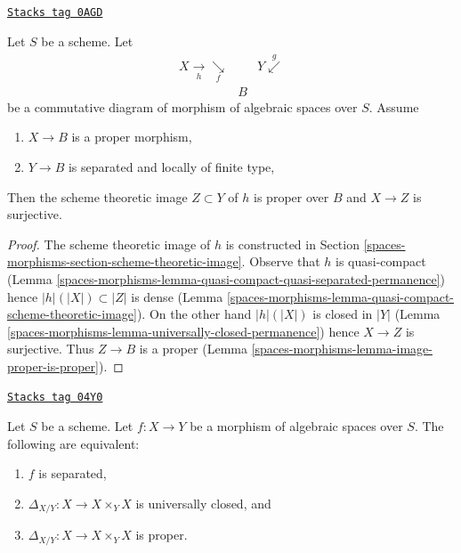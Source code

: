\begin{lemma}
\label{spaces-morphisms-lemma-scheme-theoretic-image-is-proper}
\href{https://stacks.math.columbia.edu/tag/0AGD}{\texttt{Stacks tag 0AGD}}

Let $S$ be a scheme. Let
$$
\begin{array}{ccc}X \underset{h}{\longrightarrow}\underset{f}{\searrow} &  & Y \overset{g}{\swarrow} \\  & B & \end{array}
$$
be a commutative diagram of morphism of algebraic spaces over $S$.
Assume
\begin{enumerate}
\item $X \to B$ is a proper morphism,
\item $Y \to B$ is separated and locally of finite type,
\end{enumerate}
Then the scheme theoretic image $Z \subset Y$ of $h$
is proper over $B$ and $X \to Z$ is surjective.
\end{lemma}

\begin{proof}
The scheme theoretic image of $h$ is constructed in Section
\ref{spaces-morphisms-section-scheme-theoretic-image}.
Observe that $h$ is quasi-compact
(Lemma \ref{spaces-morphisms-lemma-quasi-compact-quasi-separated-permanence})
hence $|h|(|X|) \subset |Z|$
is dense (Lemma \ref{spaces-morphisms-lemma-quasi-compact-scheme-theoretic-image}).
On the other hand $|h|(|X|)$ is closed in $|Y|$
(Lemma \ref{spaces-morphisms-lemma-universally-closed-permanence})
hence $X \to Z$ is surjective.
Thus $Z \to B$ is a proper (Lemma \ref{spaces-morphisms-lemma-image-proper-is-proper}).
\end{proof}

\begin{lemma}
\label{spaces-morphisms-lemma-separated-diagonal-proper}
\href{https://stacks.math.columbia.edu/tag/04Y0}{\texttt{Stacks tag 04Y0}}

Let $S$ be a scheme.
Let $f : X \to Y$ be a morphism of algebraic spaces over $S$.
The following are equivalent:
\begin{enumerate}
\item $f$ is separated,
\item $\Delta_{X/Y} : X \to X \times_Y X$ is universally closed, and
\item $\Delta_{X/Y} : X \to X \times_Y X$ is proper.
\end{enumerate}
\end{lemma}

